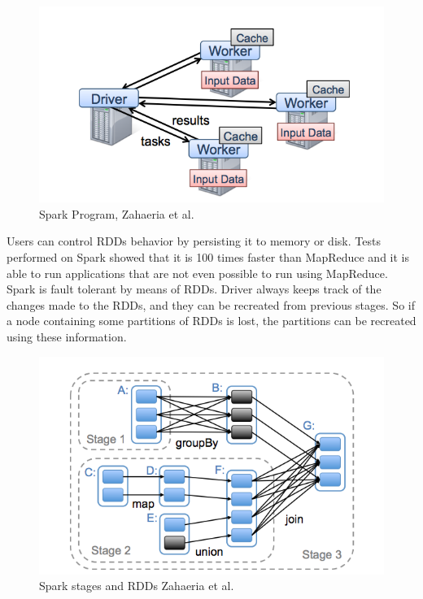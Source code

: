 \documentclass[english]{tktltiki}
\begin{document}
\begin{figure}[ht!]
\centering
\includegraphics[width=130mm]{figures/sparkprogram.png}
\caption[]{Spark Program, Zahaeria et al.\ \cite{zaharia10}}
\label{fig:sparkprogram}
\end{figure}

Users can control RDDs behavior by persisting it to memory or disk. Tests performed on Spark showed that it is 100 times faster than MapReduce and it is able to run applications that are not even possible to run using MapReduce. Spark is fault tolerant by means of RDDs. Driver always keeps track of the changes made to the RDDs, and they can be recreated from previous stages. So if a node containing some partitions of RDDs is lost, the partitions can be recreated using these information. 
 
\begin{figure}[ht!]
\centering
\includegraphics[width=130mm]{figures/rdd.png}
\caption[]{Spark stages and RDDs  Zahaeria et al.\ \cite{zaharia12} }
\label{fig:rdd}
\end{figure}
\end{document}
